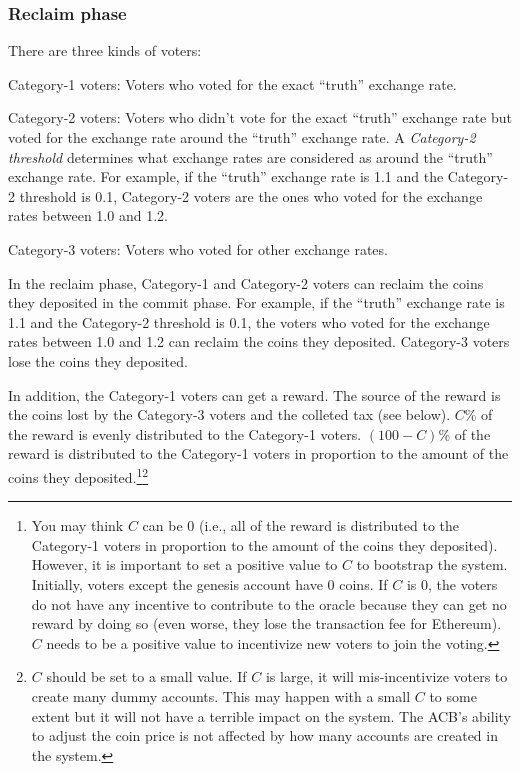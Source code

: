 \documentclass[dvipdfmx,a4paper]{article}
\begin{document}
\subsubsection{Reclaim phase}

There are three kinds of voters:

\begin{description}
\item{Category-1 voters}: Voters who voted for the exact ``truth'' exchange rate.
\item{Category-2 voters}: Voters who didn't vote for the exact ``truth'' exchange rate but voted for the exchange rate around the ``truth'' exchange rate. A \textit{Category-2 threshold} determines what exchange rates are considered as around the ``truth'' exchange rate. For example, if the ``truth'' exchange rate is 1.1 and the Category-2 threshold is 0.1, Category-2 voters are the ones who voted for the exchange rates between 1.0 and 1.2.
\item{Category-3 voters}: Voters who voted for other exchange rates.
\end{description}

In the reclaim phase, Category-1 and Category-2 voters can reclaim the coins they deposited in the commit phase. For example, if the ``truth'' exchange rate is 1.1 and the Category-2 threshold is 0.1, the voters who voted for the exchange rates between 1.0 and 1.2 can reclaim the coins they deposited. Category-3 voters lose the coins they deposited.

In addition, the Category-1 voters can get a reward. The source of the reward is the coins lost by the Category-3 voters and the colleted tax (see below). $C$\% of the reward is evenly distributed to the Category-1 voters. $(100-C)$\% of the reward is distributed to the Category-1 voters in proportion to the amount of the coins they deposited.\footnote{You may think $C$ can be 0 (i.e., all of the reward is distributed to the Category-1 voters in proportion to the amount of the coins they deposited). However, it is important to set a positive value to $C$ to bootstrap the system. Initially, voters except the genesis account have 0 coins. If $C$ is 0, the voters do not have any incentive to contribute to the oracle because they can get no reward by doing so (even worse, they lose the transaction fee for Ethereum). $C$ needs to be a positive value to incentivize new voters to join the voting.}\footnote{$C$ should be set to a small value. If $C$ is large, it will mis-incentivize voters to create many dummy accounts. This may happen with a small $C$ to some extent but it will not have a terrible impact on the system. The ACB's ability to adjust the coin price is not affected by how many accounts are created in the system.}
\end{document}
